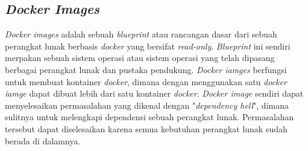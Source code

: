 	\subsection{\textit{Docker Images}}
	\textit{Docker images} adalah sebuah \textit{blueprint} atau rancangan dasar dari sebuah perangkat lunak berbasis \textit{docker} yang bersifat \textit{read-only}. \textit{Blueprint} ini sendiri merpakan sebuah sistem operasi atau sistem operasi yang telah dipasang berbagai perangkat lunak dan pustaka pendukung. \textit{Docker iamges} berfungsi untuk membuat kontainer \textit{docker}, dimana dengan menggunakan satu \textit{docker iamge} dapat dibuat lebih dari satu kontainer \textit{docker}. \textit{Docker image} sendiri dapat menyelesaikan permasalahan yang dikenal dengan "\textit{dependency hell}", dimana sulitnya untuk melengkapi dependensi sebuah perangkat lunak. Permasalahan tersebut dapat diselesaikan karena semua kebutuhan perangkat lunak sudah berada di dalamnya.
	
	